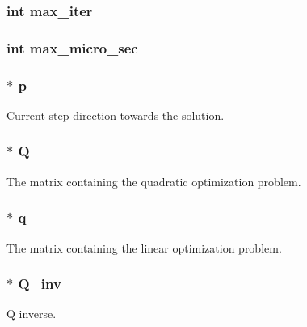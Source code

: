 \subsubsection[{max\+\_\+iter}]{\setlength{\rightskip}{0pt plus 5cm}int max\+\_\+iter}\label{structproblem_a53380b3b14c20bdfcb3bc9970c421231}
\hypertarget{structproblem_af471c126183533a7a418a166768af42d}{}
\subsubsection[{max\+\_\+micro\+\_\+sec}]{\setlength{\rightskip}{0pt plus 5cm}int max\+\_\+micro\+\_\+sec}\label{structproblem_af471c126183533a7a418a166768af42d}
\hypertarget{structproblem_a0b8e7c785036ef0cb64a801257094918}{}
\subsubsection[{p}]{$\ast$ p}\label{structproblem_a0b8e7c785036ef0cb64a801257094918}
Current step direction towards the solution. \hypertarget{structproblem_ae50fecd2794ca5844d6d01efcf17294c}{}
\subsubsection[{Q}]{$\ast$ Q}\label{structproblem_ae50fecd2794ca5844d6d01efcf17294c}
The matrix containing the quadratic optimization problem. \hypertarget{structproblem_a7755407fcbd4345b31d64bbc181af35a}{}
\subsubsection[{q}]{$\ast$ q}\label{structproblem_a7755407fcbd4345b31d64bbc181af35a}
The matrix containing the linear optimization problem. \hypertarget{structproblem_a54cc974fe14b21225c2a940ed2bf1039}{}
\subsubsection[{Q\+\_\+inv}]{$\ast$ Q\+\_\+inv}\label{structproblem_a54cc974fe14b21225c2a940ed2bf1039}
Q inverse. \hypertarget{structproblem_a70626c7db657c601438f867391005721}{}
